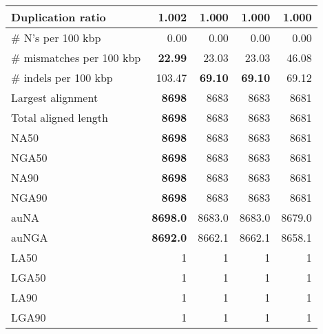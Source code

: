 \documentclass[12pt,a4paper]{article}
\begin{document}
\begin{table}[ht]
\begin{center}
\begin{tabular}{|l*{4}{|r}|}
Duplication ratio & 1.002 & {\bf 1.000} & {\bf 1.000} & {\bf 1.000} \\ \hline
\# N's per 100 kbp & 0.00 & 0.00 & 0.00 & 0.00 \\ \hline
\# mismatches per 100 kbp & {\bf 22.99} & 23.03 & 23.03 & 46.08 \\ \hline
\# indels per 100 kbp & 103.47 & {\bf 69.10} & {\bf 69.10} & 69.12 \\ \hline
Largest alignment & {\bf 8698} & 8683 & 8683 & 8681 \\ \hline
Total aligned length & {\bf 8698} & 8683 & 8683 & 8681 \\ \hline
NA50 & {\bf 8698} & 8683 & 8683 & 8681 \\ \hline
NGA50 & {\bf 8698} & 8683 & 8683 & 8681 \\ \hline
NA90 & {\bf 8698} & 8683 & 8683 & 8681 \\ \hline
NGA90 & {\bf 8698} & 8683 & 8683 & 8681 \\ \hline
auNA & {\bf 8698.0} & 8683.0 & 8683.0 & 8679.0 \\ \hline
auNGA & {\bf 8692.0} & 8662.1 & 8662.1 & 8658.1 \\ \hline
LA50 & 1 & 1 & 1 & 1 \\ \hline
LGA50 & 1 & 1 & 1 & 1 \\ \hline
LA90 & 1 & 1 & 1 & 1 \\ \hline
LGA90 & 1 & 1 & 1 & 1 \\ \hline
\end{tabular}
\end{center}
\end{table}
\end{document}
